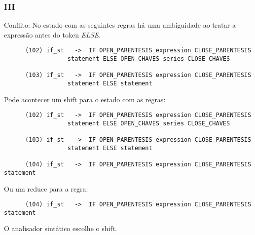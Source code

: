 \documentclass[a4paper,10pt]{article}
\begin{document}
    \subsubsection{III}
      Conflito: No estado com as seguintes regras h\'a uma ambiguidade ao tratar a express\~ao antes do token \emph{ELSE}.
      \begin{lstlisting}
      (102) if_st	->	IF OPEN_PARENTESIS expression CLOSE_PARENTESIS
				  statement ELSE OPEN_CHAVES series CLOSE_CHAVES
				  
      (103) if_st	->	IF OPEN_PARENTESIS expression CLOSE_PARENTESIS
				  statement ELSE statement 
      \end{lstlisting}
      Pode acontecer um shift para o estado com as regras:
      \begin{lstlisting}
      (102) if_st	->	IF OPEN_PARENTESIS expression CLOSE_PARENTESIS
				  statement ELSE OPEN_CHAVES series CLOSE_CHAVES
				  
      (103) if_st	->	IF OPEN_PARENTESIS expression CLOSE_PARENTESIS
				  statement ELSE statement
				  
      (104) if_st	->	IF OPEN_PARENTESIS expression CLOSE_PARENTESIS statement
      \end{lstlisting}
      Ou um reduce para a regra:
      \begin{lstlisting}
      (104) if_st	->	IF OPEN_PARENTESIS expression CLOSE_PARENTESIS statement
      \end{lstlisting}
      O analisador sint\'atico escolhe o shift.
\end{document}
